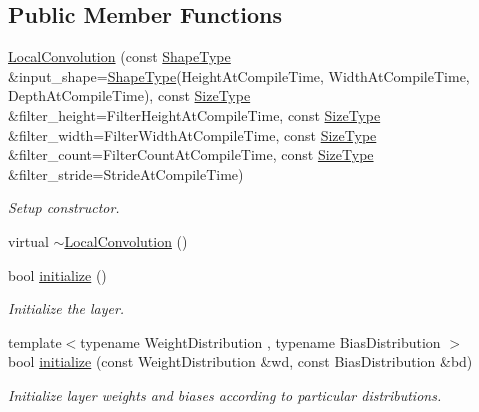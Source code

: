 \subsection*{Public Member Functions}
\begin{DoxyCompactItemize}
\item 
\hyperlink{classffnn_1_1layer_1_1_local_convolution_a54cd9bb2643136fccae8e8ca799603b1}{Local\-Convolution} (const \hyperlink{classffnn_1_1layer_1_1internal_1_1_interface_a945709b1d0ea54a51539b80d04485f5f}{Shape\-Type} \&input\-\_\-shape=\hyperlink{classffnn_1_1layer_1_1internal_1_1_interface_a945709b1d0ea54a51539b80d04485f5f}{Shape\-Type}(Height\-At\-Compile\-Time, Width\-At\-Compile\-Time, Depth\-At\-Compile\-Time), const \hyperlink{classffnn_1_1layer_1_1internal_1_1_interface_af0567642f60c65b5e87067226a54174b}{Size\-Type} \&filter\-\_\-height=Filter\-Height\-At\-Compile\-Time, const \hyperlink{classffnn_1_1layer_1_1internal_1_1_interface_af0567642f60c65b5e87067226a54174b}{Size\-Type} \&filter\-\_\-width=Filter\-Width\-At\-Compile\-Time, const \hyperlink{classffnn_1_1layer_1_1internal_1_1_interface_af0567642f60c65b5e87067226a54174b}{Size\-Type} \&filter\-\_\-count=Filter\-Count\-At\-Compile\-Time, const \hyperlink{classffnn_1_1layer_1_1internal_1_1_interface_af0567642f60c65b5e87067226a54174b}{Size\-Type} \&filter\-\_\-stride=Stride\-At\-Compile\-Time)
\begin{DoxyCompactList}\small\item\em Setup constructor. \end{DoxyCompactList}\item 
virtual \hyperlink{classffnn_1_1layer_1_1_local_convolution_aed4220121d8fd239fd4987dd423b57c5}{$\sim$\-Local\-Convolution} ()
\item 
bool \hyperlink{classffnn_1_1layer_1_1_local_convolution_ab9d84aaa24b480b95e85e2bc7c717eae}{initialize} ()
\begin{DoxyCompactList}\small\item\em Initialize the layer. \end{DoxyCompactList}\item 
{\footnotesize template$<$typename Weight\-Distribution , typename Bias\-Distribution $>$ }\\bool \hyperlink{classffnn_1_1layer_1_1_local_convolution_a584556bdf0f8c19834dad73f170f7f3a}{initialize} (const Weight\-Distribution \&wd, const Bias\-Distribution \&bd)
\begin{DoxyCompactList}\small\item\em Initialize layer weights and biases according to particular distributions. \end{DoxyCompactList}\item 

\end{DoxyCompactItemize}
